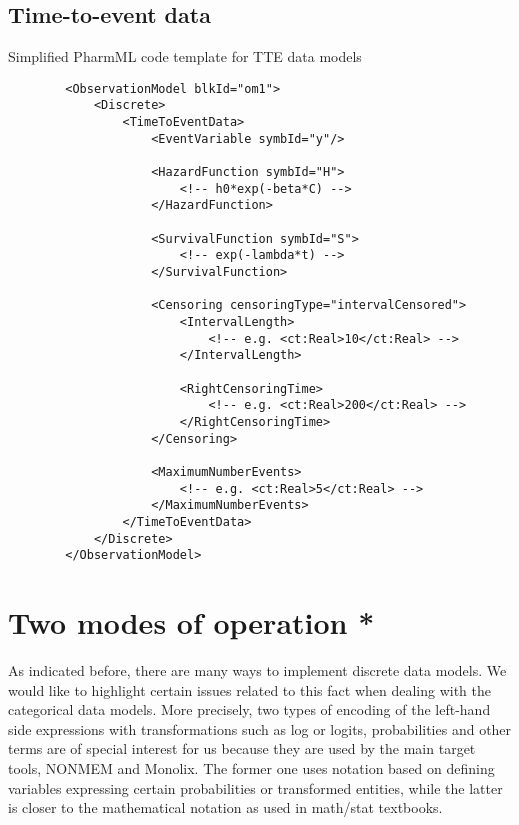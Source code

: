 \subsection{Time-to-event data}
Simplified PharmML code template for TTE data models
\lstset{language=XML}
\begin{lstlisting}
        <ObservationModel blkId="om1">
            <Discrete>
                <TimeToEventData>
                    <EventVariable symbId="y"/>
                    
                    <HazardFunction symbId="H">
                        <!-- h0*exp(-beta*C) -->
                    </HazardFunction>
                    
                    <SurvivalFunction symbId="S">
                        <!-- exp(-lambda*t) -->
                    </SurvivalFunction>
                    
                    <Censoring censoringType="intervalCensored">    
                        <IntervalLength>
                            <!-- e.g. <ct:Real>10</ct:Real> -->
                        </IntervalLength>
                        
                        <RightCensoringTime>
                            <!-- e.g. <ct:Real>200</ct:Real> -->
                        </RightCensoringTime>
                    </Censoring>
                    
                    <MaximumNumberEvents>
                        <!-- e.g. <ct:Real>5</ct:Real> -->
                    </MaximumNumberEvents>
                </TimeToEventData>
            </Discrete>
        </ObservationModel>
\end{lstlisting}


\section{Two modes of operation {\color{red} \scshape{*}}}
\label{sec:twoModes}
As indicated before, there are many ways to implement discrete data models. We would like to 
highlight certain issues related to this fact when dealing with the categorical data models. More precisely, 
two types of encoding of the left-hand side expressions with transformations such as log or logits, 
probabilities and other terms are of special interest for us because they are used by the main target 
tools, NONMEM and Monolix. The former one uses notation based on defining variables expressing 
certain probabilities or transformed entities, while the latter is closer to the mathematical notation 
as used in math/stat textbooks. 


